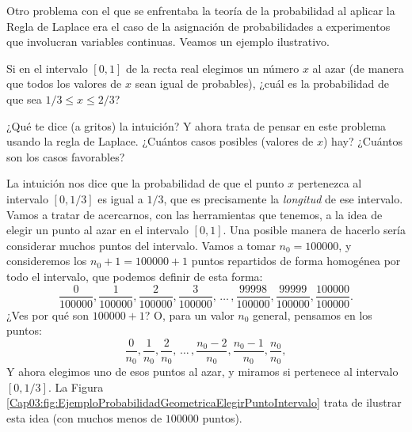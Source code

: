 Otro problema con el que se enfrentaba la teoría de la probabilidad al aplicar la Regla de Laplace
era el caso de la asignación de probabilidades a experimentos que involucran variables continuas. Veamos un ejemplo ilustrativo.
\begin{ejemplo}
\label{cap03:ejem:ProbabilidadGeometricaElegirPuntoIntervalo}
Si en el intervalo $[0,1]$ de la recta real elegimos un número $x$ al azar (de manera que todos los valores de $x$ sean igual de probables), ¿cuál es la probabilidad de que sea $1/3\leq x\leq 2/3$?

¿Qué te dice (a gritos) la intuición? Y ahora trata de pensar en este problema usando la regla de Laplace. ¿Cuántos casos posibles (valores de $x$) hay? ¿Cuántos son los casos favorables?

La intuición nos dice que la probabilidad de que el punto $x$ pertenezca al intervalo $[0,1/3]$ es igual a $1/3$, que es precisamente la {\em longitud} de ese intervalo. Vamos a tratar de acercarnos, con las herramientas que tenemos, a la idea de elegir un punto al azar en el intervalo $[0, 1]$. Una posible manera de hacerlo sería considerar muchos puntos del intervalo. Vamos a tomar $n_0=100000$, y consideremos los $n_0+1=100000+1$ puntos repartidos de forma homogénea por todo el intervalo, que podemos definir de esta forma:
\[
\dfrac{0}{100000}, \dfrac{1}{100000}, \dfrac{2}{100000},\dfrac{3}{100000},\,\ldots\,,
\dfrac{99998}{100000},\dfrac{99999}{100000},\dfrac{100000}{100000}.
\]
¿Ves por qué son $100000 + 1$? O, para un valor $n_0$ general, pensamos en los puntos:
\[\dfrac{0}{n_0}, \dfrac{1}{n_0}, \dfrac{2}{n_0}, \,\ldots\,
,\dfrac{n_0-2}{n_0},\dfrac{n_0-1}{n_0},\dfrac{n_0}{n_0},\]
Y ahora elegimos uno de esos puntos al azar, y miramos si pertenece al intervalo $[0, 1/3]$.  La Figura \ref{Cap03:fig:EjemploProbabilidadGeometricaElegirPuntoIntervalo} trata de ilustrar esta idea (con muchos menos de $100000$ puntos).


\end{ejemplo}
